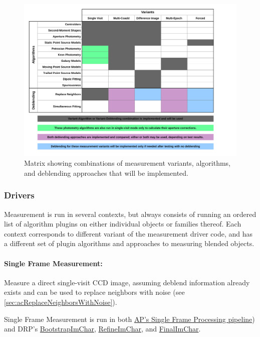 \begin{figure}
\centering
\includegraphics[width=\textwidth]{figures/measurement-matrix.pdf}
\caption{Matrix showing combinations of measurement variants, algorithms, and deblending approaches that will be implemented.
\label{fig:measurement-matrix}}
\end{figure}

\subsubsection{Drivers}
\label{sec:acMeasurementDrivers}
Measurement is run in several contexts, but always consists of running an ordered list of algorithm plugins on either individual objects or families thereof.  Each context corresponds to different variant of the measurement driver code, and has a different set of plugin algorithms and approaches to measuring blended objects.

\paragraph{Single Frame Measurement:} Measure a direct single-visit CCD image, assuming deblend information already exists and can be used to replace neighbors with noise (see \ref{sec:acReplaceNeighborsWithNoise}).
\label{sec:acSingleFrameMeasurement}

Single Frame Measurement is run in both \hyperref[sec:apSingleFrameProcessing]{AP's Single Frame Processing pipeline}) and DRP's \hyperref[sec:drpBootstrapImChar]{BootstrapImChar}, \hyperref[sec:drpRefineImChar]{RefineImChar}, and \hyperref[sec:drpFinalImChar]{FinalImChar}.

